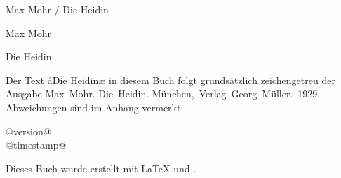 

\begin{titlepage}
\pagestyle{empty}

\begin{center}

Max Mohr / Die Heidin

\cleardoublepage

\null

\vspace{4.25ex}

\LARGE
Max Mohr

\vspace{12ex}
\Huge
Die Heidin


\clearpage

\null

\vfill

\normalfont\small

\begin{center}
Der Text \aa{}Die Heidin\ae{} in diesem Buch folgt
grundsätzlich zeichengetreu der Ausgabe\dopp{} \mbox{Max Mohr.} \mbox{Die Heidin.}
\mbox{München, Verlag Georg Müller. 1929.}
Abweichungen sind im Anhang vermerkt.
\end{center}

\begin{center}
@version@\\
@timestamp@
\end{center}

Dieses Buch wurde erstellt mit \LaTeX{} und \KOMAScript{}.

\end{center}

\end{titlepage}
